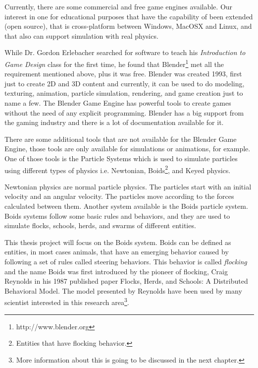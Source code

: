 
Currently, there are some commercial and free game engines available. Our interest in one for educational purposes that have the capability of been extended (open source), that is cross-platform between Windows, MacOSX and Linux, and that also can support simulation with real physics. 


While Dr. Gordon Erlebacher searched for software to teach his \textit{Introduction to Game Design} class for the first time, he found that Blender\footnote{http://www.blender.org} met all the requirement mentioned above, plus it was free. Blender was created 1993, first just to create 2D and 3D content and currently, it can be used to do modeling, texturing, animation, particle simulation, rendering, and game creation just to name a few. The Blender Game Engine has powerful tools to create games without the need of any explicit programming. Blender has a big support from the gaming industry and there is a lot of documentation available for it.  


There are some additional tools that are not available for the Blender Game Engine, those tools are only available for simulations or animations, for example. One of those tools is the Particle Systems which is used to simulate particles using different types of physics i.e. Newtonian, Boids\footnote{Entities that have flocking behavior.}, and Keyed physics. 



Newtonian physics are normal particle physics. The particles start with an initial velocity and an angular velocity.  The particles move according to the forces calculated between them. Another system available is the Boids particle system. Boids systems follow some basic rules and behaviors, and they are used to simulate flocks, schools, herds, and swarms of different entities.

This thesis project will focus on the Boids system. Boids can be defined as entities, in most cases animals, that have an emerging behavior caused by following a set of rules called steering behaviors. This behavior is called \textit{flocking} and the name Boids was first introduced by the pioneer of flocking, Craig Reynolds in his 1987 published paper Flocks, Herds, and Schools: A Distributed Behavioral Model\cite{craig1}. The model presented by Reynolds have been used by many scientist interested in this research area\footnote{More information about this is going to be discussed in the next chapter.}.

